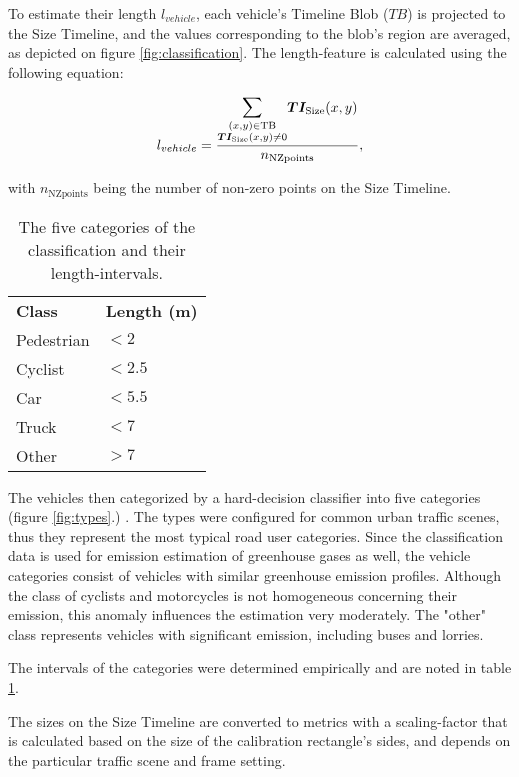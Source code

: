To estimate their length $l_{vehicle}$, each vehicle's Timeline Blob ($TB$) is projected to the Size Timeline, and the values corresponding to the blob's region are averaged, as depicted on figure \ref{fig:classification}. 
The length-feature is calculated using the following equation:

\begin{displaymath}
	l_{vehicle} = \frac{\mathlarger{\mathlarger{\sum}}\limits_{\substack{(x,y) \in \text{TB} \\ \boldsymbol{TI_{\text{Size}}}(x,y)\neq 0}} \boldsymbol{TI_{\text{Size}}}(x,y)}{n_{\text{NZpoints}}},
\end{displaymath}

with $n_{\text{NZpoints}}$ being the number of non-zero points on the Size Timeline.

\begin{table}[!h]
	\centering
	\begin{tabular}{ll}
		\textbf{Class} & \textbf{Length (m)} \\
		Pedestrian     & $< 2$               \\
		Cyclist        & $< 2.5$             \\
		Car            & $< 5.5$             \\
		Truck          & $< 7$               \\
		Other          & $> 7$              
	\end{tabular}
\caption{The five categories of the classification and their length-intervals.}
\label{tab:intervals}
\end{table}

The vehicles then categorized by a hard-decision classifier into five categories (figure \ref{fig:types}.) .
The types were configured for common urban traffic scenes, thus they represent the most typical road user categories.
Since the classification data is used for emission estimation of greenhouse gases as well, the vehicle categories consist of vehicles with similar greenhouse emission profiles.
Although the class of cyclists and motorcycles is not homogeneous concerning their emission, this anomaly influences the estimation very moderately.
The "other" class represents vehicles with significant emission, including buses and lorries. 

The intervals of the categories were determined empirically and are noted in table \ref{tab:intervals}.

The sizes on the Size Timeline are converted to metrics with a scaling-factor that is calculated based on the size of the calibration rectangle's sides, and depends on the particular traffic scene and frame setting.

